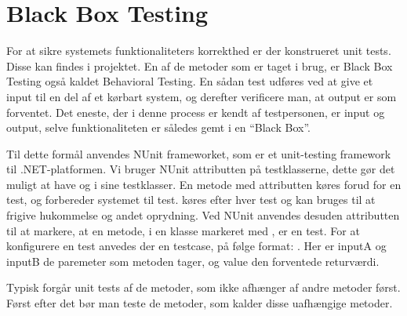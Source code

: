 \section{Black Box Testing}\label{BBtest}
For at sikre systemets funktionaliteters korrekthed er der konstrueret unit tests.
Disse kan findes i  projektet.
En af de metoder som er taget i brug, er Black Box Testing også kaldet Behavioral Testing.
En sådan test udføres ved at give et input til en del af et kørbart system, og derefter verificere man, at output er som forventet.
Det eneste, der i denne process er kendt af testpersonen, er input og output, selve funktionaliteten er således gemt i en ``Black Box''. \citep{Black_Box}

Til dette formål anvendes NUnit frameworket, som er et unit-testing framework til .NET-platformen.
Vi bruger NUnit attributten \class{[TestFixture]} på testklasserne, dette gør det muligt at have \class{[SetUp]} og \class{[TearDown]} i sine testklasser.
En metode med attributten \class{[Setup]} køres forud for en test, og forbereder systemet til test.
\class{[TearDown]} køres efter hver test og kan bruges til at frigive hukommelse og andet oprydning. 
Ved NUnit anvendes desuden attributten  til at markere, at en metode, i en klasse markeret med , er en test.
For at konfigurere en test anvedes der en testcase, på følge format: \class{[TestCase(inputA, inputB, Result=value)]}.
Her er inputA og inputB de paremeter som metoden tager, og value den forventede returværdi.

Typisk forgår unit tests af de metoder, som ikke afhænger af andre metoder først.
Først efter det bør man teste de metoder, som kalder disse uafhængige metoder. \citep{Unit_Testing}

